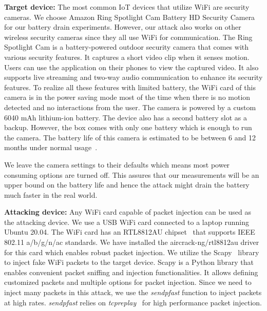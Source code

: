 \textbf{Target device: }
The most common IoT devices that utilize WiFi are security cameras.
We choose Amazon Ring Spotlight Cam Battery HD Security Camera~\cite{ring-camera} for our battery drain experiments. However, our attack also works on other wireless security cameras since they all use WiFi for communication. The Ring Spotlight Cam is a battery-powered outdoor security camera that comes with various security features. It captures a short video clip when it senses motion. Users can use the application on their phones to view the captured video. It also supports live streaming and two-way audio communication to enhance its security features. To realize all these features with limited battery, the WiFi card of this camera is in the power saving mode most of the time when there is no motion detected and no interactions from the user.
The camera is powered by a custom 6040 mAh lithium-ion battery. The device also has a second battery slot as a backup. However, the box comes with only one battery which is enough to run the camera. The battery life of this camera is estimated to be between 6 and 12 months under normal usage~\cite{ring-camera-battery1, ring-camera-battery2}.

We leave the camera settings to their defaults which means most power consuming options are turned off. This assures that our measurements will be an upper bound on the battery life and hence the attack might drain the battery much faster in the real world.

\textbf{Attacking device: }
Any WiFi card capable of packet injection can be used as the attacking device.
We use a USB WiFi card connected to a laptop running Ubuntu 20.04. The WiFi card has an RTL8812AU chipset~\cite{rtl8812au} that supports IEEE 802.11 a/b/g/n/ac standards.
We have installed the aircrack-ng/rtl8812au driver~\cite{aircrack-ng} for this card which enables robust packet injection.
We utilize the Scapy~\cite{scapy} library to inject fake WiFi packets to the target device. Scapy is a Python library that enables convenient packet sniffing and injection functionalities. It allows defining customized packets and multiple options for packet injection. 
Since we need to inject many packets in this attack, we use the \textit{sendpfast} function to inject packets at high rates. \textit{sendpfast} relies on \textit{tcpreplay}~\cite{tcpreplay} for high performance packet injection. 




